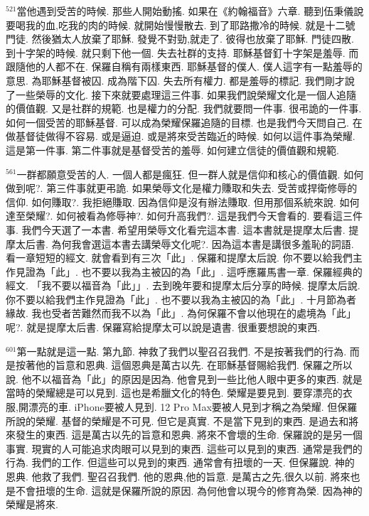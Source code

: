\documentclass{book}
\begin{document}
$^{521}$當他遇到受苦的時候.
那些人開始動搖.
如果在《約翰福音》六章.
聽到伍秉儀說要喝我的血,吃我的肉的時候.
就開始慢慢散去.
到了耶路撒冷的時候.
就是十二號門徒.
然後猶太人放棄了耶穌.
發覺不對勁,就走了.
彼得也放棄了耶穌.
門徒四散.
到十字架的時候.
就只剩下他一個.
失去社群的支持.
耶穌基督釘十字架是羞辱.
而跟隨他的人都不在.
保羅自稱有兩樣東西.
耶穌基督的僕人.
僕人這字有一點羞辱的意思.
為耶穌基督被囚.
成為階下囚.
失去所有權力.
都是羞辱的標記.
我們剛才說了一些榮辱的文化.
接下來就要處理這三件事.
如果我們說榮耀文化是一個人追隨的價值觀.
又是社群的規範.
也是權力的分配.
我們就要問一件事.
很弔詭的一件事.
如何一個受苦的耶穌基督.
可以成為榮耀保羅追隨的目標.
也是我們今天問自己.
在做基督徒做得不容易.
或是逼迫.
或是將來受苦臨近的時候.
如何以這件事為榮耀.
這是第一件事.
第二件事就是基督受苦的羞辱.
如何建立信徒的價值觀和規範.

$^{561}$一群都願意受苦的人.
一個人都是瘋狂.
但一群人就是信仰和核心的價值觀.
如何做到呢?.
第三件事就更弔詭.
如果榮辱文化是權力賺取和失去.
受苦或捍衛修辱的信仰.
如何賺取?.
我拒絕賺取.
因為信仰是沒有辦法賺取.
但用那個系統來說.
如何達至榮耀?.
如何被看為修辱神?.
如何升高我們?.
這是我們今天會看的.
要看這三件事.
我們今天選了一本書.
希望用榮辱文化看完這本書.
這本書就是提摩太后書.
提摩太后書.
為何我會選這本書去講榮辱文化呢?.
因為這本書是講很多羞恥的詞語.
看一章短短的經文.
就會看到有三次「此」.
保羅和提摩太后說.
你不要以給我們主作見證為「此」.
也不要以我為主被囚的為「此」.
這呼應羅馬書一章.
保羅經典的經文.
「我不要以福音為「此」」.
去到晚年要和提摩太后分享的時候.
提摩太后說.
你不要以給我們主作見證為「此」.
也不要以我為主被囚的為「此」.
十月節為者緣故.
我也受者苦難然而我不以為「此」.
為何保羅不會以他現在的處境為「此」呢?.
就是提摩太后書.
保羅寫給提摩太可以說是遺書.
很重要想說的東西.

$^{601}$第一點就是這一點.
第九節.
神救了我們以聖召召我們.
不是按著我們的行為.
而是按著他的旨意和恩典.
這個恩典是萬古以先.
在耶穌基督賜給我們.
保羅之所以說.
他不以福音為「此」的原因是因為.
他會見到一些比他人眼中更多的東西.
就是當時的榮耀總是可以見到.
這也是希臘文化的特色.
榮耀是要見到.
要穿漂亮的衣服,開漂亮的車.
iPhone要被人見到.
12 Pro Max要被人見到才稱之為榮耀.
但保羅所說的榮耀.
基督的榮耀是不可見.
但它是真實.
不是當下見到的東西.
是過去和將來發生的東西.
這是萬古以先的旨意和恩典.
將來不會壞的生命.
保羅說的是另一個事實.
現實的人可能追求肉眼可以見到的東西.
這些可以見到的東西.
通常是我們的行為.
我們的工作.
但這些可以見到的東西.
通常會有扭壞的一天.
但保羅說.
神的恩典.
他救了我們.
聖召召我們.
他的恩典,他的旨意.
是萬古之先,很久以前.
將來也是不會扭壞的生命.
這就是保羅所說的原因.
為何他會以現今的修育為榮.
因為神的榮耀是將來.
\end{document}
